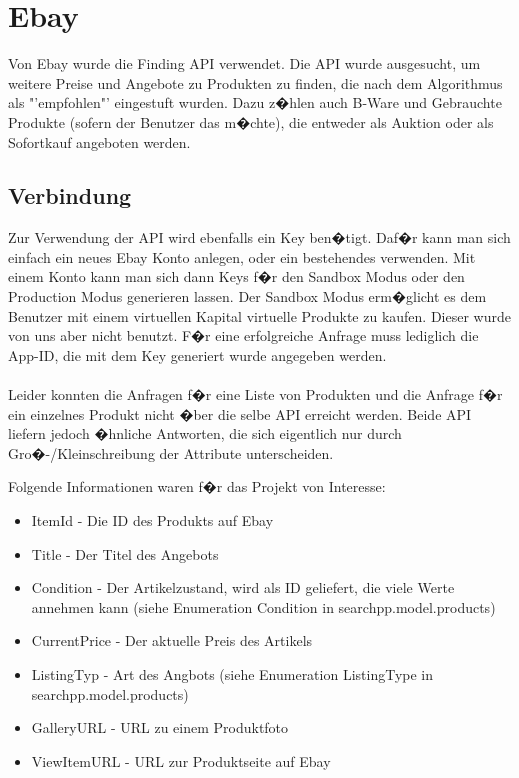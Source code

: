 \section{Ebay}
Von Ebay wurde die Finding API verwendet. Die API wurde ausgesucht, um weitere Preise und Angebote zu Produkten zu finden, die nach dem Algorithmus als "'empfohlen"' eingestuft wurden. Dazu z�hlen auch B-Ware und Gebrauchte Produkte (sofern der Benutzer das m�chte), die entweder als Auktion oder als Sofortkauf angeboten werden.

\subsection{Verbindung}
Zur Verwendung der API wird ebenfalls ein Key ben�tigt. Daf�r kann man sich einfach ein neues Ebay Konto anlegen, oder ein bestehendes verwenden. Mit einem Konto kann man sich dann Keys f�r den Sandbox Modus oder den Production Modus generieren lassen. Der Sandbox Modus erm�glicht es dem Benutzer mit einem virtuellen Kapital virtuelle Produkte zu kaufen. Dieser wurde von uns aber nicht benutzt.
F�r eine erfolgreiche Anfrage muss lediglich die App-ID, die mit dem Key generiert wurde angegeben werden.
\\\\
Leider konnten die Anfragen f�r eine Liste von Produkten und die Anfrage f�r ein einzelnes Produkt nicht �ber die selbe API erreicht werden. Beide API liefern jedoch �hnliche Antworten, die sich eigentlich nur durch Gro�-/Kleinschreibung der Attribute unterscheiden.

Folgende Informationen waren f�r das Projekt von Interesse:

\begin{itemize}
	\item ItemId - Die ID des Produkts auf Ebay
	\item Title - Der Titel des Angebots
	\item Condition - Der Artikelzustand, wird als ID geliefert, die viele Werte annehmen kann (siehe Enumeration Condition in searchpp.model.products)
	\item CurrentPrice - Der aktuelle Preis des Artikels
	\item ListingTyp - Art des Angbots (siehe Enumeration ListingType in searchpp.model.products)
	\item GalleryURL - URL zu einem Produktfoto
	\item ViewItemURL - URL zur Produktseite auf Ebay
\end{itemize}

